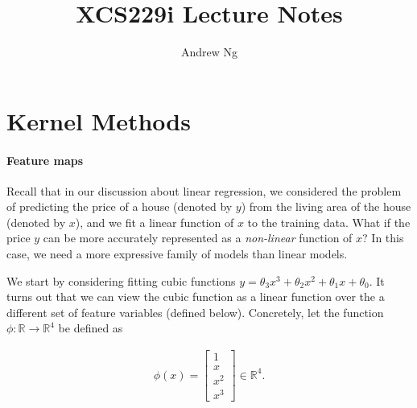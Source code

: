 \documentclass{article}
\begin{document}
\title{XCS229i Lecture Notes}
\author{Andrew Ng}
\date{}
\maketitle


\setcounter{part}{4}


\part{Kernel Methods}

\setcounter{section}{1}

\subsection{Feature maps}
Recall that in our discussion about linear regression, we considered the problem  of predicting the price of a house (denoted by $y$) from the living area of the house (denoted by $x$), and we fit a linear function of $x$ to the training data. What if the price $y$ can be more accurately represented as a \textit{non-linear} function of $x$?  In this case, we need a more expressive family of models than linear models. %

We start by considering fitting cubic functions $y = \theta_3 x^3 + \theta_2 x^2 + \theta_1 x+ \theta_0$. It turns out that we can view the cubic function as a linear function over the a different set of feature variables (defined below). Concretely, let the function $\phi:\mathbb{R}\rightarrow \mathbb{R}^4$ be defined as

\begin{align}
\phi(x) = \left[\begin{array}{c} 1\\ x \\ x^2 \\ x^3 \end{array}\right]\in \mathbb{R}^4. \label{eqn:feature-map}
\end{align}
\end{document}
